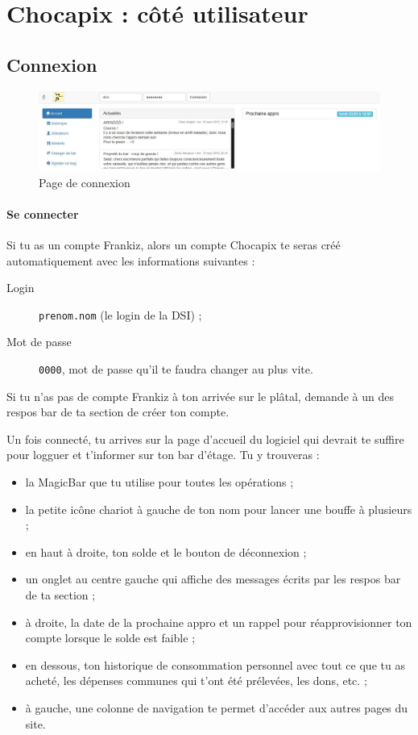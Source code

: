 \documentclass[12pt,french]{article}
\begin{document}
\section{Chocapix : côté utilisateur}

\subsection{Connexion}

\begin{figure}[h]
\centering
\includegraphics[width=16cm]{images/login}
\caption{Page de connexion}
\end{figure}

\paragraph{Se connecter} Si tu as un compte Frankiz, alors un compte Chocapix te seras créé automatiquement avec les informations suivantes :
\begin{description}
\item[Login] \texttt{prenom.nom} (le login de la DSI) ;
\item[Mot de passe] \texttt{0000}, mot de passe qu'il te faudra changer au plus vite.
\end{description}
Si tu n'as pas de compte Frankiz à ton arrivée sur le plâtal, demande à un des respos bar de ta section de créer ton compte.

Un fois connecté, tu arrives sur la page d'accueil du logiciel qui devrait te suffire pour logguer et t'informer sur ton bar d'étage. Tu y trouveras :
\begin{itemize}
	\item la MagicBar\texttrademark{} que tu utilise pour toutes les opérations ;
	\item la petite icône chariot à gauche de ton nom pour lancer une bouffe à plusieurs ;
	\item en haut à droite, ton solde et le bouton de déconnexion ;
	\item un onglet  au centre gauche qui affiche des messages écrits par les respos bar de ta section ;
	\item  à droite, la date de la prochaine appro et un rappel pour réapprovisionner ton compte lorsque le solde est faible ;
	\item en dessous, ton historique de consommation personnel avec tout ce que tu as acheté, les dépenses communes qui t'ont été prélevées, les dons, etc. ;
	\item à gauche, une colonne de navigation te permet d'accéder aux autres pages du site.
\end{itemize}
\end{document}
